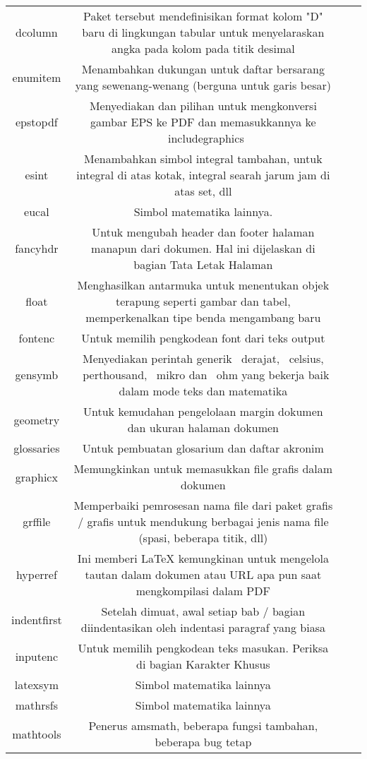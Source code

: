 \begin{table}[ht]
\begin{tabular}{cccc}
		dcolumn&Paket tersebut mendefinisikan format kolom "D" baru di lingkungan tabular untuk menyelaraskan angka pada kolom pada titik desimal&\\
		enumitem&Menambahkan dukungan untuk daftar bersarang yang sewenang-wenang (berguna untuk garis besar)&\\
		epstopdf&Menyediakan dan pilihan untuk mengkonversi gambar EPS ke PDF dan memasukkannya ke \ includegraphics {}&\\
		esint&Menambahkan simbol integral tambahan, untuk integral di atas kotak, integral searah jarum jam di atas set, dll&\\
		eucal&Simbol matematika lainnya.&\\
		fancyhdr&Untuk mengubah header dan footer halaman manapun dari dokumen. Hal ini dijelaskan di bagian Tata Letak Halaman&\\
		float&Menghasilkan antarmuka untuk menentukan objek terapung seperti gambar dan tabel, memperkenalkan tipe benda mengambang baru &\\
		fontenc&Untuk memilih pengkodean font dari teks output&\\
		gensymb&Menyediakan perintah generik \ derajat, \ celsius, \ perthousand, \ mikro dan \ ohm yang bekerja baik dalam mode teks dan matematika&\\
		geometry&Untuk kemudahan pengelolaan margin dokumen dan ukuran halaman dokumen&\\
		glossaries&Untuk pembuatan glosarium dan daftar akronim&\\
		graphicx&Memungkinkan untuk memasukkan file grafis dalam dokumen&\\
		grffile&Memperbaiki pemrosesan nama file dari paket grafis / grafis untuk mendukung berbagai jenis nama file (spasi, beberapa titik, dll)&\\
		hyperref&Ini memberi LaTeX kemungkinan untuk mengelola tautan dalam dokumen atau URL apa pun saat mengkompilasi dalam PDF&\\
		indentfirst&Setelah dimuat, awal setiap bab / bagian diindentasikan oleh indentasi paragraf yang biasa&\\
		inputenc&Untuk memilih pengkodean teks masukan. Periksa di bagian Karakter Khusus&\\
		latexsym&Simbol matematika lainnya&\\
			mathrsfs&Simbol matematika lainnya&\\
		mathtools&Penerus amsmath, beberapa fungsi tambahan, beberapa bug tetap&\\
	\end{tabular}
\end{table}

